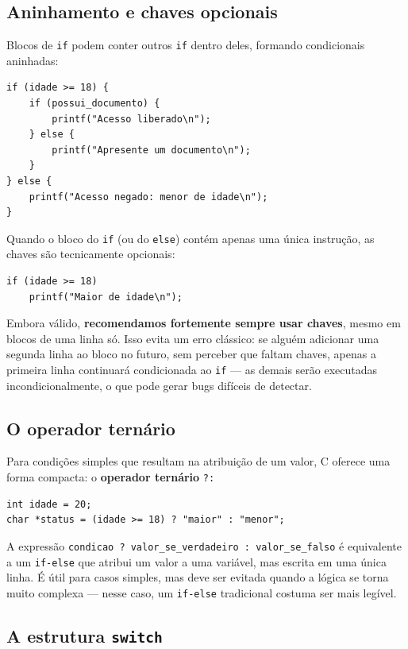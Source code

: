 \subsection{Aninhamento e chaves opcionais}

Blocos de \texttt{if} podem conter outros \texttt{if} dentro deles, formando condicionais aninhadas:

\begin{lstlisting}
if (idade >= 18) {
    if (possui_documento) {
        printf("Acesso liberado\n");
    } else {
        printf("Apresente um documento\n");
    }
} else {
    printf("Acesso negado: menor de idade\n");
}
\end{lstlisting}

Quando o bloco do \texttt{if} (ou do \texttt{else}) contém apenas uma única instrução, as chaves são tecnicamente opcionais:

\begin{lstlisting}
if (idade >= 18)
    printf("Maior de idade\n");
\end{lstlisting}

Embora válido, \textbf{recomendamos fortemente sempre usar chaves}, mesmo em blocos de uma linha só. Isso evita um erro clássico: se alguém adicionar uma segunda linha ao bloco no futuro, sem perceber que faltam chaves, apenas a primeira linha continuará condicionada ao \texttt{if} — as demais serão executadas incondicionalmente, o que pode gerar bugs difíceis de detectar.

\subsection{O operador ternário}

Para condições simples que resultam na atribuição de um valor, C oferece uma forma compacta: o \textbf{operador ternário} \texttt{?:}

\begin{lstlisting}
int idade = 20;
char *status = (idade >= 18) ? "maior" : "menor";
\end{lstlisting}

A expressão \texttt{condicao ? valor\_se\_verdadeiro : valor\_se\_falso} é equivalente a um \texttt{if-else} que atribui um valor a uma variável, mas escrita em uma única linha. É útil para casos simples, mas deve ser evitada quando a lógica se torna muito complexa — nesse caso, um \texttt{if-else} tradicional costuma ser mais legível.

\subsection{A estrutura \texttt{switch}}

